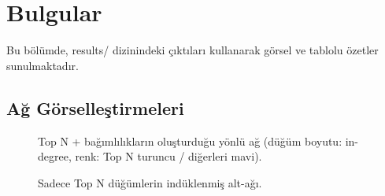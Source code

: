 \documentclass[11pt,a4paper]{article}
\begin{document}
\section{Bulgular}
Bu bölümde, results/ dizinindeki çıktıları kullanarak görsel ve tablolu özetler sunulmaktadır.

\subsection{Ağ Görselleştirmeleri}
\begin{figure}[h]
  \centering
  \caption{Top N + bağımlılıkların oluşturduğu yönlü ağ (düğüm boyutu: in-degree, renk: Top N turuncu / diğerleri mavi).}
\end{figure}

\begin{figure}[h]
  \centering
  \caption{Sadece Top N düğümlerin indüklenmiş alt-ağı.}
\end{figure}
\end{document}
